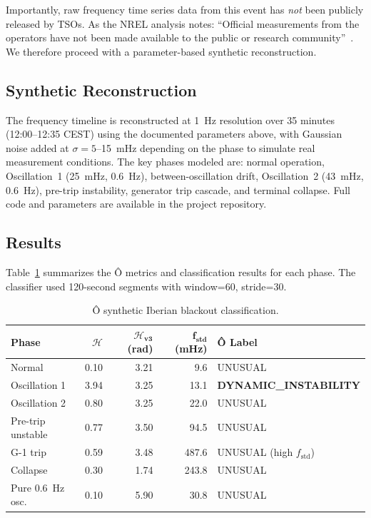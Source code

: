 \documentclass[11pt,a4paper]{article}
\begin{document}
Importantly, raw frequency time series data from this event has \emph{not} been publicly released by TSOs. As the NREL analysis notes: ``Official measurements from the operators have not been made available to the public or research community''~\cite{nrel_iberian}. We therefore proceed with a parameter-based synthetic reconstruction.

\subsection{Synthetic Reconstruction}

The frequency timeline is reconstructed at 1~Hz resolution over 35 minutes (12:00--12:35 CEST) using the documented parameters above, with Gaussian noise added at $\sigma = 5$--15~mHz depending on the phase to simulate real measurement conditions. The key phases modeled are: normal operation, Oscillation~1 (25~mHz, 0.6~Hz), between-oscillation drift, Oscillation~2 (43~mHz, 0.6~Hz), pre-trip instability, generator trip cascade, and terminal collapse. Full code and parameters are available in the project repository.

\subsection{Results}

Table~\ref{tab:iberian_synth} summarizes the Ô metrics and classification results for each phase. The classifier used 120-second segments with window=60, stride=30.

\begin{table}[H]
\centering
\caption{Ô synthetic Iberian blackout classification.}
\label{tab:iberian_synth}
\begin{tabular}{lrrrl}
\toprule
\textbf{Phase} & $\boldsymbol{\mathcal{H}}$ & $\boldsymbol{\mathcal{H}_{\text{v3}}}$ (rad) & $\boldsymbol{f_{\text{std}}}$ (mHz) & \textbf{Ô Label} \\
\midrule
Normal               & 0.10 & 3.21 & 9.6  & UNUSUAL \\
Oscillation 1        & 3.94 & 3.25 & 13.1 & \textbf{DYNAMIC\_INSTABILITY} \\
Oscillation 2        & 0.80 & 3.25 & 22.0 & UNUSUAL \\
Pre-trip unstable    & 0.77 & 3.50 & 94.5 & UNUSUAL \\
G-1 trip             & 0.59 & 3.48 & 487.6 & UNUSUAL (high $f_{\text{std}}$) \\
Collapse             & 0.30 & 1.74 & 243.8 & UNUSUAL \\
Pure 0.6~Hz osc.     & 0.10 & 5.90 & 30.8 & UNUSUAL \\
\bottomrule
\end{tabular}
\end{table}
\end{document}
